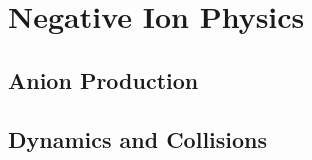 %
	\section{Negative Ion Physics}\label{sec:negionphysics}
%
		\subsection{Anion Production}\label{sec:anionproduction}
%
		\subsection{Dynamics and Collisions}\label{sec:negiondynamics}
%
